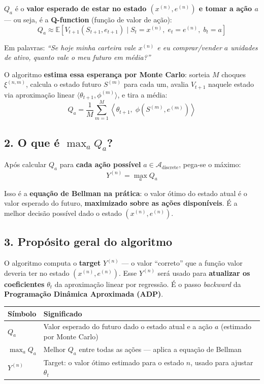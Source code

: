 \documentclass[12pt,a4paper]{article}
\begin{document}
$Q_a$ é o \textbf{valor esperado de estar no estado $(x^{(n)}, e^{(n)})$ e tomar a ação $a$} --- ou seja, é a \textbf{Q-function} (função de valor de ação):
\begin{equation}
    Q_a \approx \mathbb{E}\!\left[V_{t+1}(S_{t+1}, e_{t+1}) \mid S_t = x^{(n)},\; e_t = e^{(n)},\; b_t = a\right]
\end{equation}

Em palavras: \textit{``Se hoje minha carteira vale $x^{(n)}$ e eu comprar/vender $a$ unidades de ativo, quanto vale o meu futuro em média?''}

O algoritmo \textbf{estima essa esperança por Monte Carlo}: sorteia $M$ choques $\xi^{(n,m)}$, calcula o estado futuro $S^{(m)}$ para cada um, avalia $V_{t+1}$ naquele estado via aproximação linear $\langle \theta_{t+1}, \phi^{(m)} \rangle$, e tira a média:
\begin{equation}
    Q_a = \frac{1}{M} \sum_{m=1}^{M} \left\langle \theta_{t+1},\; \phi\!\left(S^{(m)}, e^{(m)}\right) \right\rangle
\end{equation}

\subsection{2. O que é \texorpdfstring{$\max_a Q_a$}{max Qa}?}

Após calcular $Q_a$ para \textbf{cada ação possível} $a \in \mathcal{A}_{\text{discrete}}$, pega-se o máximo:
\begin{equation}
    Y^{(n)} = \max_a Q_a
\end{equation}

Isso é a \textbf{equação de Bellman na prática}: o valor ótimo do estado atual é o valor esperado do futuro, \textbf{maximizado sobre as ações disponíveis}. É a melhor decisão possível dado o estado $(x^{(n)}, e^{(n)})$.

\subsection{3. Propósito geral do algoritmo}

O algoritmo computa o \textbf{target} $Y^{(n)}$ --- o valor ``correto'' que a função valor deveria ter no estado $(x^{(n)}, e^{(n)})$. Esse $Y^{(n)}$ será usado para \textbf{atualizar os coeficientes} $\theta_t$ da aproximação linear por regressão. É o passo \textit{backward} da \textbf{Programação Dinâmica Aproximada (ADP)}.

\begin{center}
\begin{tabular}{ll}
\hline
\textbf{Símbolo} & \textbf{Significado} \\
\hline
$Q_a$ & Valor esperado do futuro dado o estado atual e a ação $a$ (estimado por Monte Carlo) \\
$\max_a Q_a$ & Melhor $Q_a$ entre todas as ações --- aplica a equação de Bellman \\
$Y^{(n)}$ & Target: o valor ótimo estimado para o estado $n$, usado para ajustar $\theta_t$ \\
\hline
\end{tabular}
\end{center}
\end{document}

